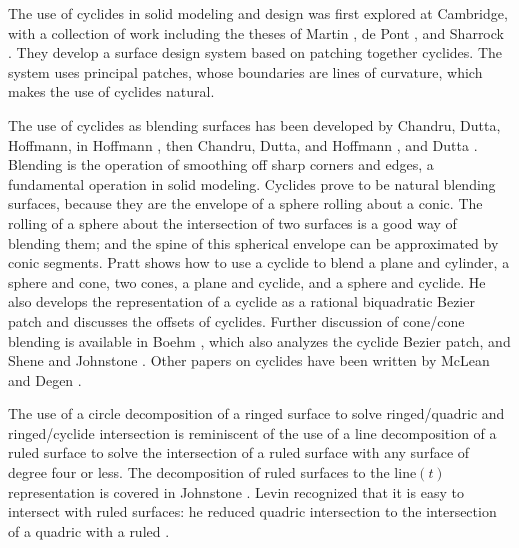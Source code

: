 The use of cyclides in solid modeling and design was first explored
at Cambridge, with a collection of work including the theses of Martin 
\cite{MAR82}, de Pont \cite{DEP84}, and Sharrock \cite{SHAR85}.
They develop a surface design system based on patching together cyclides.
The system uses principal patches, whose boundaries are lines of curvature, 
which makes the use of cyclides natural.

The use of cyclides as blending surfaces has been developed by Chandru, Dutta, 
Hoffmann, in Hoffmann \cite{H88}, then Chandru, Dutta, and Hoffmann 
\cite{CDH89b-ifip}, and Dutta \cite{Dutta89}.
Blending is the operation of smoothing off sharp corners and edges,
a fundamental operation in solid modeling.
Cyclides prove to be natural blending surfaces,
because they are the envelope of a sphere rolling about a conic.
The rolling of a sphere about the intersection of two surfaces is a good way
of blending them; and the spine of this spherical envelope can be approximated
by conic segments.
Pratt \cite{P89,PRA89,Pratt90} 
shows how to use a cyclide to blend a plane and cylinder,
a sphere and cone, two cones, a plane and cyclide, and a sphere and cyclide.
He also develops the representation of a cyclide as a rational 
biquadratic Bezier patch and discusses the offsets of cyclides.
Further discussion of cone/cone blending is
available in Boehm \cite{Boehm90}, which also 
analyzes the cyclide Bezier patch, and Shene and Johnstone \cite{Shenejj92}.
Other papers on cyclides have been written by McLean \cite{Mc85} and Degen
\cite{Degen90}.

The use of a circle decomposition of a ringed surface to solve
ringed/quadric and ringed/cyclide intersection is reminiscent of the use
of a line decomposition of a ruled surface to solve the intersection
of a ruled surface with any surface of degree four or less.
The decomposition of ruled surfaces to the $\mbox{line}(t)$ representation 
is covered in Johnstone \cite{JOH89}.
Levin recognized that it is easy to intersect with ruled surfaces: 
he reduced quadric intersection to the 
intersection of a quadric with a ruled \cite{LEVI76}.


% 

